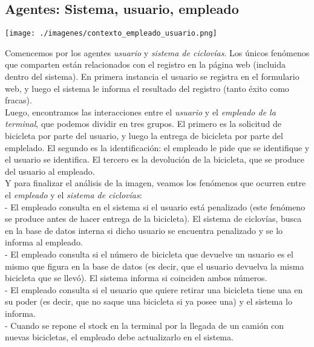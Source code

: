 \documentclass[a4paper, 11pt, spanish]{article}
\begin{document}
\subsection{Agentes: Sistema, usuario, empleado}

\centerline{\texttt{[image: ./imagenes/contexto\_empleado\_usuario.png]}}
 
 
Comencemos por los agentes \textit{usuario} y \textit{sistema de ciclovías}. Los únicos fenómenos que comparten están relacionados con el registro en la página web (incluida dentro del sistema). En primera instancia el usuario se registra en el formulario web, y luego el sistema le informa el resultado del registro (tanto éxito como fracas).\\
 
Luego, encontramos las interacciones entre el \textit{usuario} y el \textit{empleado de la terminal}, que podemos dividir en tres grupos. El primero es la solicitud de bicicleta por parte del usuario, y luego la entrega de bicicleta por parte del emplelado. El segundo es la identificación: el empleado le pide que se identifique y el usuario se identifica. El tercero es la devolución de la bicicleta, que se produce del usuario al empleado.\\

Y para finalizar el análisis de la imagen, veamos los fenómenos que ocurren entre el \textit{empleado} y el \textit{sistema de ciclovías}:\\

- El empleado consulta en el sistema si el usuario está penalizado (este fenómeno se produce antes de hacer entrega de la bicicleta). El sistema de ciclovías, busca en la base de datos interna si dicho usuario se encuentra penalizado y se lo informa al empleado.\\

- El empleado consulta si el número de bicicleta que devuelve un usuario es el mismo que figura en la base de datos (es decir, que el usuario devuelva la misma bicicleta que se llevó). El sistema informa si coinciden ambos números.\\

- El empleado consulta si el usuario que quiere retirar una bicicleta tiene una en su poder (es decir, que no saque una bicicleta si ya posee una) y el sistema lo informa.\\

- Cuando se repone el stock en la terminal por la llegada de un camión con nuevas bicicletas, el empleado debe actualizarlo en el sistema.\\
\end{document}
